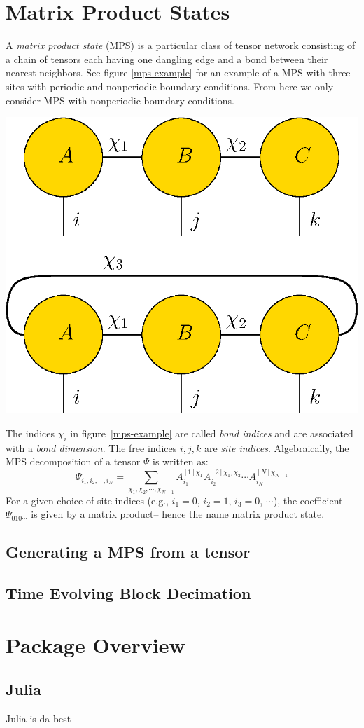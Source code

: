 \documentclass[12pt]{article}
\newenvironment{Figure}
  {\par\medskip\noindent\minipage{\linewidth}}
  {\endminipage\par\medskip}
\begin{document}
\begin{multicols}{2}
\section*{Matrix Product States}
	A \textit{matrix product state} (MPS) is a particular class
	of
	tensor network consisting of a chain of tensors each having one
	dangling edge and a bond between their nearest neighbors. See figure
	\ref{mps-example} for an example of a MPS with three sites with
	periodic and nonperiodic boundary conditions. From here we only
	consider MPS with nonperiodic boundary conditions.
	\begin{Figure}
		\center\includegraphics[width=.7\textwidth]{./Figures/mps-example.eps}
		\label{mps-example}
	\end{Figure}
	The indices $\chi_i$ in figure~\ref{mps-example} are called
	\textit{bond indices} and are associated with a
	\textit{bond dimension}. The free indices $i,j,k$ are
	\textit{site indices}. Algebraically, the MPS decomposition of a tensor $\Psi$ is written as:
	$$\Psi_{i_1,i_2,\cdots,i_N}=\sum_{\chi_1,\chi_2,\cdots,\chi_{N-1}}A^{[1]\chi_1}_{i_1}A_{i_2}^{[2]\chi_1,\chi_2}\cdots A^{[N]\chi_{N-1}}_{i_N}$$
	For a given choice of site indices (e.g., $i_1=0$, $i_2=1$, $i_3=0$,
	$\cdots$), the coefficient $\Psi_{010\cdots}$ is given by a matrix
	product-- hence the name matrix product state.
	\subsection*{Generating a MPS from a tensor}
	\subsection*{Time Evolving Block Decimation}
\section*{Package Overview}
	\subsection*{Julia}
		Julia is da best


\end{multicols}

\end{document}
